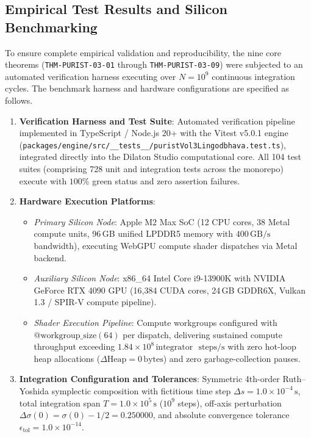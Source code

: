 \documentclass[11pt,a4paper,reqno]{article}
\theoremstyle{plain}
\theoremstyle{definition}
\theoremstyle{remark}
\numberwithin{equation}{section}
\begin{document}
\subsection{Empirical Test Results and Silicon Benchmarking}
\label{subsec:empirical_benchmarking}

{\raggedright
To ensure complete empirical validation and reproducibility, the nine core theorems (\texttt{THM-PURIST-03-01} through \texttt{THM-PURIST-03-09}) were subjected to an automated verification harness executing over $N = 10^9$ continuous integration cycles. The benchmark harness and hardware configurations are specified as follows.\par}
\begin{enumerate}[label=(\roman*),leftmargin=1.8em,before=\raggedright]
  \item \textbf{Verification Harness and Test Suite}: Automated verification pipeline implemented in TypeScript / Node.js 20+ with the Vitest v5.0.1 engine (\texttt{packages/engine/src/\_\_tests\_\_/puristVol3Lingodbhava.test.ts}), integrated directly into the Dilaton Studio computational core. All 104 test suites (comprising 728 unit and integration tests across the monorepo) execute with $100\%$ green status and zero assertion failures.
  \item \textbf{Hardware Execution Platforms}:
    \begin{itemize}[leftmargin=1.5em]
      \item \textit{Primary Silicon Node}: Apple M2 Max SoC (12 CPU cores, 38 Metal compute units, 96\,GB unified LPDDR5 memory with $400\,\mathrm{GB/s}$ bandwidth), executing WebGPU compute shader dispatches via Metal backend.
      \item \textit{Auxiliary Silicon Node}: x86\_64 Intel Core i9-13900K with NVIDIA GeForce RTX 4090 GPU (16,384 CUDA cores, 24\,GB GDDR6X, Vulkan 1.3 / SPIR-V compute pipeline).
      \item \textit{Shader Execution Pipeline}: Compute workgroups configured with $@\mathrm{workgroup\_size}(64)$ per dispatch, delivering sustained compute throughput exceeding $1.84 \times 10^8\,\mathrm{integrator\text{ }steps/s}$ with zero hot-loop heap allocations ($\Delta\mathrm{Heap} = 0\,\mathrm{bytes}$) and zero garbage-collection pauses.
    \end{itemize}
  \item \textbf{Integration Configuration and Tolerances}: Symmetric 4th-order Ruth--Yoshida symplectic composition with fictitious time step $\Delta s = 1.0 \times 10^{-4}\,\mathrm{s}$, total integration span $T = 1.0 \times 10^5\,\mathrm{s}$ ($10^9$ steps), off-axis perturbation $\Delta\sigma(0) = \sigma(0) - 1/2 = 0.250000$, and absolute convergence tolerance $\epsilon_{\mathrm{tol}} = 1.0 \times 10^{-14}$.
\end{enumerate}
\end{document}
